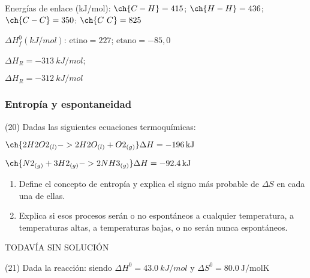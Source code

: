 \documentclass[10pt]{article}
\newenvironment{gexdatos}{
      \noindent\makebox[0pt][r]{\textit{Datos:}}
    }{\vspace{5pt}}
\begin{document}
\begin{multicols}{2}
\begin{exercise}[
    tags    = {},
    topics  = {química, termodinámica, termoquímica},
    source  = {FQ 1B MGH 2016, p180, e18},
  ]
  \begin{gexdatos}
    Energías de enlace (\si{kJ/mol}): \( \ch{C-H} = 415 \); \( \ch{H-H} = 436 \); \( \ch{C-C} = 350 \): \( \ch{C~C} = 825 \)

    \( \Delta H^0_f (\si{kJ/mol}) \): \( \textrm{etino} = 227 \); \( \textrm{etano} = -85,0 \)
  \end{gexdatos}
\end{exercise}

\begin{solution}
  \begin{enumerate*}
    \item \( \Delta H_R = \SI{-313}{kJ/mol} \);
    \item \( \Delta H_R = \SI{-312}{kJ/mol} \)
  \end{enumerate*}
\end{solution}






\subsubsection{Entropía y espontaneidad}

\begin{exercise}[
    tags    = {},
    topics  = {química, termodinámica, termoquímica},
    source  = {FQ 1B MGH 2016, p181, e20},
  ]
  (20) Dadas las siguientes ecuaciones termoquímicas:

  \( \ch{2 H2O2_{(l)} -> 2 H2O_{(l)} + O2_{(g)}} \Delta H = \SI{-196}{kJ} \)

  \( \ch{N2_{(g)} + 3 H2_{(g)} -> 2 NH3 _{(g)}} \Delta H = \SI{-92.4}{kJ} \)

  \begin{enumerate}
    \item Define el concepto de entropía y explica el signo más probable de \( \Delta S \) en cada una de ellas.
    \item Explica si esos procesos serán o no espontáneos a cualquier
    temperatura, a temperaturas altas, a temperaturas bajas, o no serán nunca espontáneos.
  \end{enumerate}
\end{exercise}

\begin{solution}[print=false]
  TODAVÍA SIN SOLUCIÓN
\end{solution}




\begin{exercise}[
    tags    = {},
    topics  = {química, termodinámica, termoquímica},
    source  = {FQ 1B MGH 2016, p181, e21},
  ]
  (21) Dada la reacción: 
  siendo \( \Delta H^0 = \SI{43.0}{kJ/mol} \) y \( \Delta S^0 = \SI{80.0}{\joule\per\mole\kelvin} \) %


\end{exercise}
\end{multicols}
\end{document}
